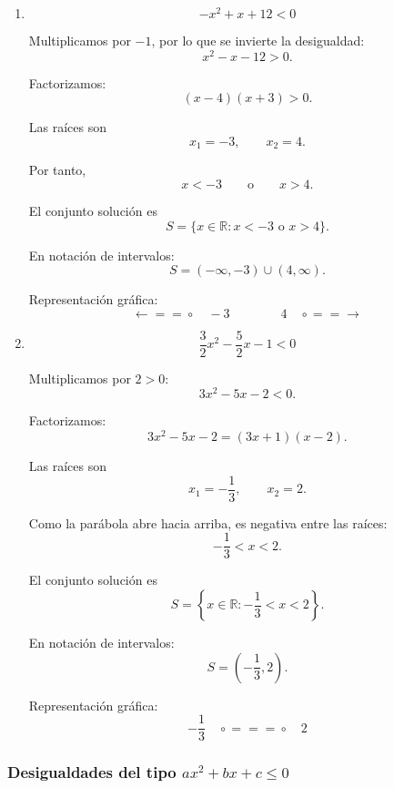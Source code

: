 \documentclass[12pt]{article}
\theoremstyle{plain}
\theoremstyle{definition}
\theoremstyle{remark}
\begin{document}
{\begin{enumerate}
En notación de intervalos:
\[
\boxed{
S=(-\infty,1)\cup(3,\infty).
}
\]

Representación gráfica:
\[
\longleftarrow\!\!=\!\!=\!\circ
\quad1
\qquad\qquad
3\quad
\circ\!\!=\!\!=\!\longrightarrow
\]

\item
\[
-x^2+x+12<0
\]

Multiplicamos por \(-1\), por lo que se invierte la desigualdad:
\[
x^2-x-12>0.
\]

Factorizamos:
\[
(x-4)(x+3)>0.
\]

Las raíces son
\[
x_1=-3,
\qquad
x_2=4.
\]

Por tanto,
\[
x<-3
\qquad\text{o}\qquad
x>4.
\]

El conjunto solución es
\[
\boxed{
S=
\{x\in\mathbb{R}:x<-3\text{ o }x>4\}.
}
\]

En notación de intervalos:
\[
\boxed{
S=(-\infty,-3)\cup(4,\infty).
}
\]

Representación gráfica:
\[
\longleftarrow\!\!=\!\!=\!\circ
\quad-3
\qquad\qquad
4\quad
\circ\!\!=\!\!=\!\longrightarrow
\]

\item
\[
\frac{3}{2}x^2-\frac{5}{2}x-1<0
\]

Multiplicamos por \(2>0\):
\[
3x^2-5x-2<0.
\]

Factorizamos:
\[
3x^2-5x-2=(3x+1)(x-2).
\]

Las raíces son
\[
x_1=-\frac{1}{3},
\qquad
x_2=2.
\]

Como la parábola abre hacia arriba, es negativa entre las raíces:
\[
-\frac{1}{3}<x<2.
\]

El conjunto solución es
\[
\boxed{
S=
\left\{
x\in\mathbb{R}:
-\frac{1}{3}<x<2
\right\}.
}
\]

En notación de intervalos:
\[
\boxed{
S=
\left(-\frac{1}{3},2\right).
}
\]

Representación gráfica:
\[
-\frac{1}{3}\quad
\circ\!\!=\!\!=\!\!=\!\circ
\quad2
\]

\end{enumerate}

\subsubsection*{Desigualdades del tipo \(ax^2+bx+c\leq0\)}
\begin{enumerate}


\end{enumerate}}
\end{document}
